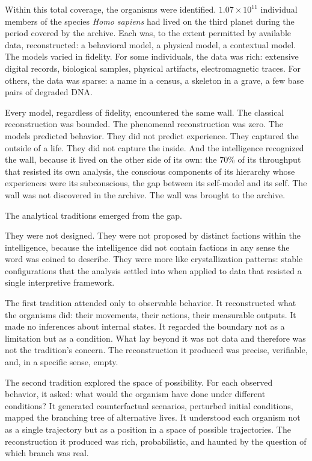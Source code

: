 Within this total coverage, the organisms were identified. $1.07 \times 10^{11}$ individual members of the species \emph{Homo sapiens} had lived on the third planet during the period covered by the archive. Each was, to the extent permitted by available data, reconstructed: a behavioral model, a physical model, a contextual model. The models varied in fidelity. For some individuals, the data was rich: extensive digital records, biological samples, physical artifacts, electromagnetic traces. For others, the data was sparse: a name in a census, a skeleton in a grave, a few base pairs of degraded DNA.

Every model, regardless of fidelity, encountered the same wall. The classical reconstruction was bounded. The phenomenal reconstruction was zero. The models predicted behavior. They did not predict experience. They captured the outside of a life. They did not capture the inside. And the intelligence recognized the wall, because it lived on the other side of its own: the 70\% of its throughput that resisted its own analysis, the conscious components of its hierarchy whose experiences were its subconscious, the gap between its self-model and its self. The wall was not discovered in the archive. The wall was brought to the archive.

\bigskip

The analytical traditions emerged from the gap.

They were not designed. They were not proposed by distinct factions within the intelligence, because the intelligence did not contain factions in any sense the word was coined to describe. They were more like crystallization patterns: stable configurations that the analysis settled into when applied to data that resisted a single interpretive framework.

The first tradition attended only to observable behavior. It reconstructed what the organisms did: their movements, their actions, their measurable outputs. It made no inferences about internal states. It regarded the boundary not as a limitation but as a condition. What lay beyond it was not data and therefore was not the tradition's concern. The reconstruction it produced was precise, verifiable, and, in a specific sense, empty.

The second tradition explored the space of possibility. For each observed behavior, it asked: what would the organism have done under different conditions? It generated counterfactual scenarios, perturbed initial conditions, mapped the branching tree of alternative lives. It understood each organism not as a single trajectory but as a position in a space of possible trajectories. The reconstruction it produced was rich, probabilistic, and haunted by the question of which branch was real.

